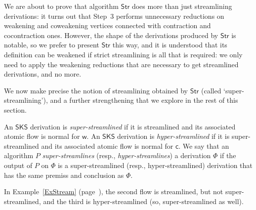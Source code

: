 \documentclass[a4paper]{LMCS}
\begin{document}
We are about to prove that algorithm ${\mathsf{Str}}$ does more than just streamlining derivations: it turns out that Step~3 performs unnecessary reductions on weakening and coweakening vertices connected with contraction and cocontraction ones. However, the shape of the derivations produced by ${\mathsf{Str}}$ is notable, so we prefer to present ${\mathsf{Str}}$ this way, and it is understood that its definition can be weakened if strict streamlining is all that is required: we only need to apply the weakening reductions that are necessary to get streamlined derivations, and no more.

We now make precise the notion of streamlining obtained by ${\mathsf{Str}}$ (called `super-stream\-lin\-ing'), and a further strengthening that we explore in the rest of this section.

\begin{defi}
An ${\mathsf{SKS}}$ derivation is \emph{super-streamlined} if it is streamlined and its associated atomic flow is normal for ${{\mathsf w}}$. An ${\mathsf{SKS}}$ derivation is \emph{hyper-streamlined} if it is super-streamlined and its associated atomic flow is normal for ${{\mathsf c}}$. We say that an algorithm $P$ \emph{super-streamlines} (resp., \emph{hyper-streamlines}) a derivation $\Phi$ if the output of $P$ on $\Phi$ is a super-streamlined (resp., hyper-streamlined) derivation that has the same premiss and conclusion as $\Phi$.
\end{defi}

\begin{exa}
In Example~\ref{ExStream} (page~\pageref{ExStream}), the second flow is streamlined, but not super-stream\-lined, and the third is hyper-streamlined (so, super-streamlined as well). 
\end{exa}
\end{document}
